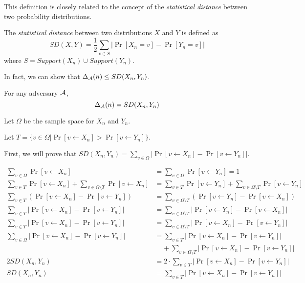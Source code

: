 This definition is closely related to the concept of the \textit{statistical distance} between two probability distributions.
\begin{definition}
The \emph{statistical distance} between two distributions $X$ and $Y$ is defined as
$$SD(X, Y) = \frac{1}{2}\sum\limits_{v \in S}|\Pr[X_n = v] - \Pr[Y_n = v]|$$
where $S = Support(X_n) \cup Support(Y_n)$.
\end{definition}
In fact, we can show that $\Delta_{\mathcal{A}}(n) \le SD(X_n, Y_n)$.
\begin{lemma}
    For any adversary $\mathcal{A}$,
    $$\Delta_{\mathcal{A}}(n) = SD(X_n, Y_n)$$
\end{lemma}

\proof
Let $\Omega$ be the sample space for $X_n$ and $Y_n$.

Let $T = \{v \in \Omega | \Pr[v \leftarrow X_n] > \Pr[v \leftarrow Y_n]\}$.

First, we will prove that $SD(X_n, Y_n) = \sum\limits_{v \in \Omega} |\Pr[v \leftarrow X_n] - \Pr[v \leftarrow Y_n]|$.

\begin{align*}
    \sum\limits_{v \in \Omega} \Pr[v \leftarrow X_n] &= \sum\limits_{v \in \Omega} \Pr[v \leftarrow Y_n] = 1 \\
    \sum\limits_{v \in T}\Pr[v \leftarrow X_n] + \sum\limits_{v \in \Omega\setminus T}\Pr[v \leftarrow X_n] &= \sum\limits_{v \in T}\Pr[v \leftarrow Y_n] + \sum\limits_{v \in \Omega\setminus T}\Pr[v \leftarrow Y_n]\\
    \sum\limits_{v \in T}(\Pr[v \leftarrow X_n] - \Pr[v \leftarrow Y_n]) &= \sum\limits_{v \in \Omega \setminus T}(\Pr[v \leftarrow Y_n] - \Pr[v \leftarrow X_n])\\
    \sum\limits_{v \in T}|\Pr[v \leftarrow X_n] - \Pr[v \leftarrow Y_n]| &= \sum\limits_{v \in \Omega \setminus T}|\Pr[v \leftarrow Y_n] - \Pr[v \leftarrow X_n]|\\
    \sum\limits_{v \in T}|\Pr[v \leftarrow X_n] - \Pr[v \leftarrow Y_n]| &= \sum\limits_{v \in \Omega \setminus T}|\Pr[v \leftarrow X_n] - \Pr[v \leftarrow Y_n]|\\
    \sum\limits_{v \in \Omega}|\Pr[v \leftarrow X_n] - \Pr[v \leftarrow Y_n]| &= \sum\limits_{v \in T}|\Pr[v \leftarrow X_n] - \Pr[v \leftarrow Y_n]|\\
    &\;\;\;\; + \sum\limits_{v \in \Omega \setminus T}|\Pr[v \leftarrow X_n] - \Pr[v \leftarrow Y_n]|\\
    2SD(X_n, Y_n) &= 2 \cdot \sum\limits_{v \in T}|\Pr[v \leftarrow X_n] - \Pr[v \leftarrow Y_n]|\\
    SD(X_n, Y_n) &= \sum\limits_{v \in T}|\Pr[v \leftarrow X_n] - \Pr[v \leftarrow Y_n]|
\end{align*}

